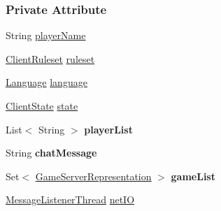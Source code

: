 \subsubsection*{Private Attribute}
\begin{DoxyCompactItemize}
\item 
\hypertarget{a00003_a12adf3f64463f614eb3af6dd82414e0a}{String \hyperlink{a00003_a12adf3f64463f614eb3af6dd82414e0a}{player\-Name}}\label{a00003_a12adf3f64463f614eb3af6dd82414e0a}

\item 
\hypertarget{a00003_a9c280012d0d8f96783ebdeee9c22b646}{\hyperlink{a00056}{Client\-Ruleset} \hyperlink{a00003_a9c280012d0d8f96783ebdeee9c22b646}{ruleset}}\label{a00003_a9c280012d0d8f96783ebdeee9c22b646}

\item 
\hypertarget{a00003_a431aadd49e0ba3c9fb62b88ced697cc4}{\hyperlink{a00015}{Language} \hyperlink{a00003_a431aadd49e0ba3c9fb62b88ced697cc4}{language}}\label{a00003_a431aadd49e0ba3c9fb62b88ced697cc4}

\item 
\hypertarget{a00003_ab46b82250c6c463f6ce90486153cb55e}{\hyperlink{a00004}{Client\-State} \hyperlink{a00003_ab46b82250c6c463f6ce90486153cb55e}{state}}\label{a00003_ab46b82250c6c463f6ce90486153cb55e}

\item 
\hypertarget{a00003_a2a62caed4423183b9e69deb6560b136f}{List$<$ String $>$ {\bfseries player\-List}}\label{a00003_a2a62caed4423183b9e69deb6560b136f}

\item 
\hypertarget{a00003_a36925554bcf553be7b9b408466fe794c}{String {\bfseries chat\-Message}}\label{a00003_a36925554bcf553be7b9b408466fe794c}

\item 
\hypertarget{a00003_a3181880192ac35123553866694553d59}{Set$<$ \hyperlink{a00073}{Game\-Server\-Representation} $>$ {\bfseries game\-List}}\label{a00003_a3181880192ac35123553866694553d59}

\item 
\hypertarget{a00003_a95e1dc2c60f1fe9bcaaba816079c9854}{\hyperlink{a00005}{Message\-Listener\-Thread} \hyperlink{a00003_a95e1dc2c60f1fe9bcaaba816079c9854}{net\-I\-O}}\label{a00003_a95e1dc2c60f1fe9bcaaba816079c9854}

\end{DoxyCompactItemize}


